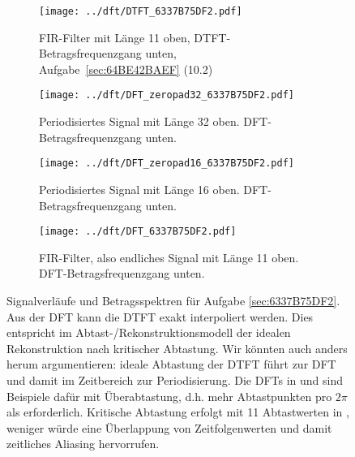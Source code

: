 \begin{figure*}[h!]
\centering
\begin{subfigure}{0.495\textwidth}
\texttt{[image: ../dft/DTFT\_6337B75DF2.pdf]}
\caption{FIR-Filter mit Länge 11 oben, DTFT-Betragsfrequenzgang unten,
Aufgabe~\ref{sec:64BE42BAEF} (10.2)}
\label{fig:DTFT_6337B75DF2}
\end{subfigure}
\begin{subfigure}{0.495\textwidth}
\texttt{[image: ../dft/DFT\_zeropad32\_6337B75DF2.pdf]}
\caption{Periodisiertes Signal mit Länge 32 oben. DFT-Betragsfrequenzgang unten.}
\label{fig:DFT_zeropad32_6337B75DF2}
\end{subfigure}

\begin{subfigure}{0.495\textwidth}
\texttt{[image: ../dft/DFT\_zeropad16\_6337B75DF2.pdf]}
\caption{Periodisiertes Signal mit Länge 16 oben. DFT-Betragsfrequenzgang unten.}
\label{fig:DFT_zeropad16_6337B75DF2}
\end{subfigure}
\begin{subfigure}{0.495\textwidth}
\texttt{[image: ../dft/DFT\_6337B75DF2.pdf]}
\caption{FIR-Filter, also endliches Signal mit Länge 11 oben.
DFT-Betragsfrequenzgang unten.}
\label{fig:DFT_6337B75DF2}
\end{subfigure}
\caption{Signalverläufe und Betragsspektren für Aufgabe \ref{sec:6337B75DF2}.
Aus der DFT  kann die DTFT 
exakt interpoliert werden. Dies entspricht im Abtast-/Rekonstruktionsmodell
der idealen Rekonstruktion nach kritischer Abtastung.
%
Wir könnten auch anders herum argumentieren: ideale
Abtastung der DTFT führt zur DFT und damit im Zeitbereich zur Periodisierung.
Die DFTs in  und
 sind Beispiele dafür mit Überabtastung, d.h.
mehr Abtastpunkten pro $2\pi$ als erforderlich. Kritische Abtastung erfolgt mit
11 Abtastwerten in , weniger würde eine Überlappung
von Zeitfolgenwerten und damit zeitliches Aliasing hervorrufen.
}
\label{fig:6337B75DF2}
\end{figure*}









\clearpage
